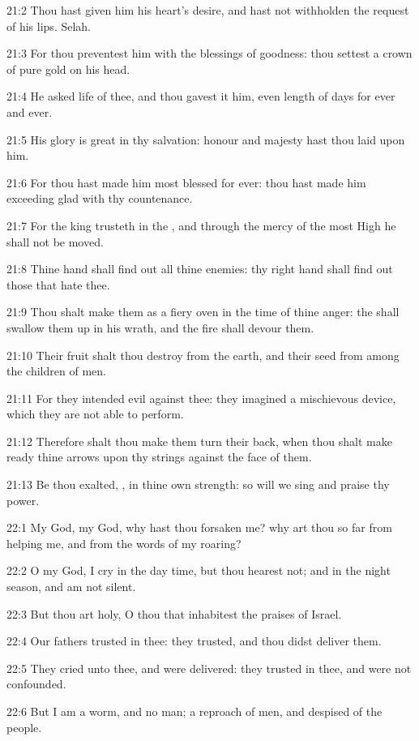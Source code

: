 21:2 Thou hast given him his heart's desire, and hast not withholden
the request of his lips. Selah.

21:3 For thou preventest him with the blessings of goodness: thou
settest a crown of pure gold on his head.

21:4 He asked life of thee, and thou gavest it him, even length of
days for ever and ever.

21:5 His glory is great in thy salvation: honour and majesty hast thou
laid upon him.

21:6 For thou hast made him most blessed for ever: thou hast made him
exceeding glad with thy countenance.

21:7 For the king trusteth in the \LORD, and through the mercy of the
most High he shall not be moved.

21:8 Thine hand shall find out all thine enemies: thy right hand shall
find out those that hate thee.

21:9 Thou shalt make them as a fiery oven in the time of thine anger:
the \LORD shall swallow them up in his wrath, and the fire shall devour
them.

21:10 Their fruit shalt thou destroy from the earth, and their seed
from among the children of men.

21:11 For they intended evil against thee: they imagined a mischievous
device, which they are not able to perform.

21:12 Therefore shalt thou make them turn their back, when thou shalt
make ready thine arrows upon thy strings against the face of them.

21:13 Be thou exalted, \LORD, in thine own strength: so will we sing
and praise thy power.



22:1 My God, my God, why hast thou forsaken me? why art thou so far
from helping me, and from the words of my roaring?

22:2 O my God, I cry in the day time, but thou hearest not; and in the
night season, and am not silent.

22:3 But thou art holy, O thou that inhabitest the praises of Israel.

22:4 Our fathers trusted in thee: they trusted, and thou didst deliver
them.

22:5 They cried unto thee, and were delivered: they trusted in thee,
and were not confounded.

22:6 But I am a worm, and no man; a reproach of men, and despised of
the people.

